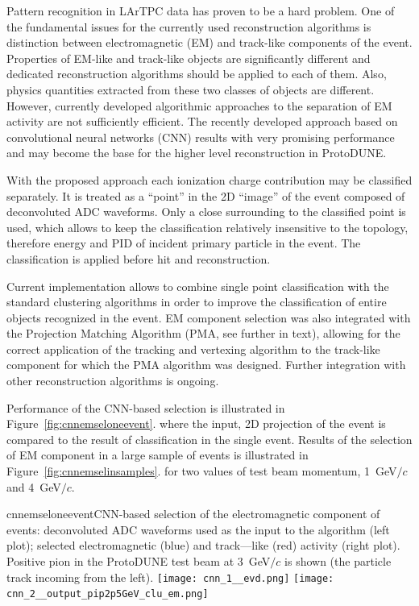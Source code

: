 Pattern recognition in LArTPC data has proven to be a hard problem. One of the
fundamental issues for the currently used reconstruction algorithms is distinction
between electromagnetic (EM) and track-like components of the event. Properties of
EM-like and track-like objects are significantly different and dedicated
reconstruction algorithms should be applied to each of them. Also, physics
quantities extracted from these two classes of objects are different. However,
currently developed algorithmic approaches to the separation of EM activity are
not sufficiently efficient. The recently developed approach based on convolutional
neural networks (CNN) results with very promising performance and may become the
base for the higher level reconstruction in ProtoDUNE.

With the proposed approach each ionization charge contribution may be classified
separately. It is treated as a “point” in the 2D “image” of the event composed of
deconvoluted ADC waveforms. Only a close surrounding to the classified point is used,
which allows to keep the classification relatively insensitive to the topology,
therefore energy and PID of incident primary particle in the event. The classification
is applied before hit and reconstruction.

Current implementation allows to combine single point classification with the standard
clustering algorithms in order to improve the classification of entire objects
recognized in the event. EM component selection was also integrated with the Projection
Matching Algorithm (PMA, see further in text), allowing for the correct application of
the tracking and vertexing algorithm to the track-like component for which the PMA
algorithm was designed. Further integration with other reconstruction algorithms is
ongoing.

Performance of the CNN-based selection is illustrated in Figure~\ref{fig:cnnemseloneevent}.
where the input, 2D projection of the event is compared to the result of classification
in the single event. Results of the selection of EM component in a large sample of events
is illustrated in Figure~\ref{fig:cnnemselinsamples}. for two values of test beam momentum,
1~GeV$/c$ and 4~GeV$/c$.

\begin{cdrfigure}{cnnemseloneevent}{CNN-based
selection of the electromagnetic component of events: deconvoluted ADC waveforms used
as the input to the algorithm (left plot); selected electromagnetic (blue) and
track—like (red) activity (right plot). Positive pion in the ProtoDUNE test beam at
3~GeV$/c$ is shown (the particle track incoming from the left).}
\texttt{[image: cnn\_1\_\_evd.png]}
\texttt{[image: cnn\_2\_\_output\_pip2p5GeV\_clu\_em.png]}
\end{cdrfigure}

